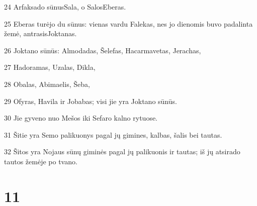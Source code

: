 \par 24 Arfaksado sūnus­Sala, o Salos­Eberas. 
\par 25 Eberas turėjo du sūnus: vienas vardu Falekas, nes jo dienomis buvo padalinta žemė, antrasis­Joktanas. 
\par 26 Joktano sūnūs: Almodadas, Šelefas, Hacarmavetas, Jerachas, 
\par 27 Hadoramas, Uzalas, Dikla, 
\par 28 Obalas, Abimaelis, Šeba, 
\par 29 Ofyras, Havila ir Jobabas; visi jie yra Joktano sūnūs. 
\par 30 Jie gyveno nuo Mešos iki Sefaro kalno rytuose. 
\par 31 Šitie yra Semo palikuonys pagal jų gimines, kalbas, šalis bei tautas. 
\par 32 Šitos yra Nojaus sūnų giminės pagal jų palikuonis ir tautas; iš jų atsirado tautos žemėje po tvano.



\chapter{11}


